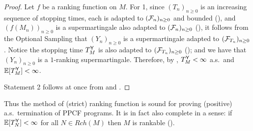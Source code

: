 \begin{proof}
Let $f$ be a ranking function on $M$.
For 1, since $(T_n)_{n \geq 0}$ is an increasing sequence of stopping times, each is adapted to $(\mathcal{F}_n)_{n \geq 0}$ and bounded (),
and $(f(M_n))_{n \geq 0}$ is a supermartingale also adapted to $(\mathcal{F}_n)_{n \geq 0}$ (),
it follows from the Optional Sampling  that $(Y_n)_{n \geq 0}$ %
is a supermartingale adapted to $(\mathcal{F}_{T_n})_{n \geq 0}$.
Notice the stopping time $T_M^{\mathsf{Y}}$ is also adapted to $(\mathcal{F}_{T_n})_{n \geq 0}$ (); and we have that $(Y_n)_{n \geq 0}$ is a $1$-ranking supermartingale.
Therefore, by , $T^{\mathsf{Y}}_M < \infty$ a.s.~and $\mathbb{E}[T^{\mathsf{Y}}_M] < \infty$.

Statement 2 follows at once from  and .
\end{proof}

Thus the method of (strict) ranking function is sound for proving (positive) a.s.~termination of PPCF programs.
It is in fact also complete in a sense: if $\mathbb{E}[T^{\mathsf{Y}}_N] < \infty$ for all $N \in \mathit{Rch}(M)$ then $M$ is rankable ().
